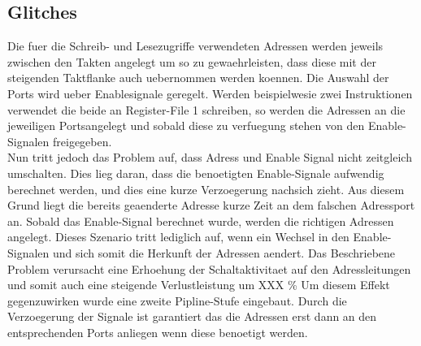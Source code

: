 \subsection{Glitches}
Die fuer die Schreib- und Lesezugriffe verwendeten Adressen werden jeweils zwischen den Takten angelegt um so zu gewaehrleisten, dass diese mit der steigenden Taktflanke auch uebernommen werden koennen. Die Auswahl der Ports wird ueber Enablesignale geregelt. Werden beispielwesie zwei Instruktionen verwendet die beide an Register-File 1 schreiben, so werden die Adressen an die jeweiligen Portsangelegt und sobald diese zu verfuegung stehen von den Enable-Signalen freigegeben.\\
Nun tritt jedoch das Problem auf, dass Adress und Enable Signal nicht zeitgleich umschalten. Dies lieg daran, dass die benoetigten Enable-Signale aufwendig berechnet werden, und dies eine kurze Verzoegerung nachsich zieht. Aus diesem Grund liegt die bereits geaenderte Adresse kurze Zeit an dem falschen Adressport an. Sobald das Enable-Signal berechnet wurde, werden die richtigen Adressen angelegt. Dieses Szenario tritt lediglich auf, wenn ein Wechsel in den Enable-Signalen und sich somit die Herkunft der Adressen aendert. Das Beschriebene Problem verursacht eine Erhoehung der Schaltaktivitaet auf den Adressleitungen und somit auch eine steigende Verlustleistung um XXX \%
Um diesem Effekt gegenzuwirken wurde eine zweite Pipline-Stufe eingebaut. Durch die Verzoegerung der Signale ist garantiert das die Adressen erst dann an den entsprechenden Ports anliegen wenn diese benoetigt werden. 

